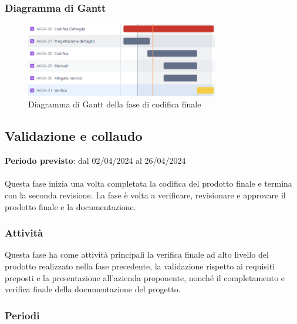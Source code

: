\newpage 
\subsubsection{Diagramma di Gantt}\label{sec:pianificazione:progCodifica:gantt}

\begin{figure}[H]
    \centering
    \includegraphics[width=0.75\textwidth]{images/gantt_dettaglio.PNG}
    \caption{Diagramma di Gantt della fase di codifica finale}
    \label{fig:gantt_codRTB}
\end{figure}


\subsection{Validazione e collaudo}\label{sec:pianificazione:val_collaudo}

\textbf{Periodo previsto}: dal 02/04/2024 al 26/04/2024\\\\
Questa fase inizia una volta completata la codifica del prodotto finale e termina con la seconda revisione. La fase è volta a verificare, revisionare e approvare il prodotto finale e la documentazione.

\subsubsection{Attività}\label{sec:pianificazione:val_collaudo:attivita}
Questa fase ha come attività principali la verifica finale ad alto livello del prodotto realizzato nella fase precedente, la validazione rispetto ai requisiti preposti e la presentazione all'azienda proponente, nonché il completamento e verifica finale della documentazione del progetto.

\subsubsection{Periodi}\label{sec:pianificazione:val_collaudo:periodi}
